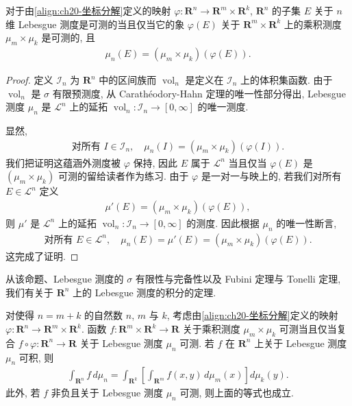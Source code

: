 \documentclass[../../main.tex]{subfiles}
\begin{document}
\begin{proposition}\label{proposition:ch20-乘积同构}
对于由\eqref{align:ch20-坐标分解}定义的映射 $\varphi:\mathbf{R}^{n}\to\mathbf{R}^{m}\times\mathbf{R}^{k}$, $\mathbf{R}^{n}$ 的子集 $E$ 关于 $n$ 维 Lebesgue 测度是可测的当且仅当它的象 $\varphi(E)$ 关于 $\mathbf{R}^{m}\times\mathbf{R}^{k}$ 上的乘积测度 $\mu_{m}\times\mu_{k}$ 是可测的, 且
\begin{align*}
\mu_{n}(E)=(\mu_{m}\times\mu_{k})(\varphi(E)).
\end{align*}
\end{proposition}

\begin{proof}
定义 $\mathcal{I}_{n}$ 为 $\mathbf{R}^{n}$ 中的区间族而 $\operatorname{vol}_{n}$ 是定义在 $\mathcal{I}_{n}$ 上的体积集函数. 由于 $\operatorname{vol}_{n}$ 是 $\sigma$ 有限预测度, 从 Carath\'eodory-Hahn 定理的唯一性部分得出, Lebesgue 测度 $\mu_{n}$ 是 $\mathcal{L}^{n}$ 上的延拓 $\operatorname{vol}_{n}:\mathcal{I}_{n}\to[0,\infty]$ 的唯一测度.

显然,
\begin{align}\label{align:ch20-区间体积保持}
\text{对所有 }I\in\mathcal{I}_{n},\quad\mu_{n}(I)=(\mu_{m}\times\mu_{k})(\varphi(I)).
\end{align}
我们把证明这蕴涵外测度被 $\varphi$ 保持, 因此 $E$ 属于 $\mathcal{L}^{n}$ 当且仅当 $\varphi(E)$ 是 $(\mu_{m}\times\mu_{k})$ 可测的留给读者作为练习. 由于 $\varphi$ 是一对一与映上的, 若我们对所有 $E\in\mathcal{L}^{n}$ 定义
\begin{align*}
\mu'(E)=(\mu_{m}\times\mu_{k})(\varphi(E)),
\end{align*}
则 $\mu'$ 是 $\mathcal{L}^{n}$ 上的延拓 $\operatorname{vol}_{n}:\mathcal{I}_{n}\to[0,\infty]$ 的测度. 因此根据 $\mu_{n}$ 的唯一性断言,
\begin{align*}
\text{对所有 }E\in\mathcal{L}^{n},\quad\mu_{n}(E)=\mu'(E)=(\mu_{m}\times\mu_{k})(\varphi(E)).
\end{align*}
这完成了证明.
\end{proof}

从该命题、Lebesgue 测度的 $\sigma$ 有限性与完备性以及 Fubini 定理与 Tonelli 定理, 我们有关于 $\mathbf{R}^{n}$ 上的 Lebesgue 测度的积分的定理.

\begin{theorem}\label{theorem:ch20-富比尼Lebesgue}
对使得 $n=m+k$ 的自然数 $n$, $m$ 与 $k$, 考虑由\eqref{align:ch20-坐标分解}定义的映射 $\varphi:\mathbf{R}^{n}\to\mathbf{R}^{m}\times\mathbf{R}^{k}$. 函数 $f:\mathbf{R}^{m}\times\mathbf{R}^{k}\to\mathbf{R}$ 关于乘积测度 $\mu_{m}\times\mu_{k}$ 可测当且仅当复合 $f\circ\varphi:\mathbf{R}^{n}\to\mathbf{R}$ 关于 Lebesgue 测度 $\mu_{n}$ 可测. 若 $f$ 在 $\mathbf{R}^{n}$ 上关于 Lebesgue 测度 $\mu_{n}$ 可积, 则
\begin{align}\label{align:ch20-累次积分}
\int_{\mathbf{R}^{n}}f\,d\mu_{n}=\int_{\mathbf{R}^{k}}\left[\int_{\mathbf{R}^{m}}f(x,y)\,d\mu_{m}(x)\right]d\mu_{k}(y).
\end{align}
此外, 若 $f$ 非负且关于 Lebesgue 测度 $\mu_{n}$ 可测, 则上面的等式也成立.
\end{theorem}
\end{document}
